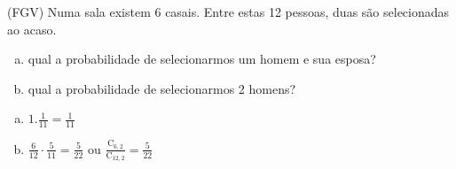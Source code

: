 \begin{ex}
(FGV) Numa sala existem 6 casais. Entre estas 12 pessoas, duas são selecionadas ao acaso.
   \begin{enumerate}[(a)]
   \item qual a probabilidade de selecionarmos um homem e sua esposa?
   \item qual a probabilidade de selecionarmos 2 homens?
   \end{enumerate}
     \begin{sol}
       \phantom{A} 
         \begin{enumerate} [(a)]
             \item $1.\frac{1}{11}=\frac{1}{11}$
             \item $\frac{6}{12}\cdot\frac{5}{11}=\frac{5}{22}$ \hspace{0,2cm} ou \hspace{0,2cm} $\frac{\mathrm{C}_{6,2}}{\mathrm{C}_{{12},2}}=\frac{5}{22}$
         \end{enumerate}
     \end{sol}
\end{ex}